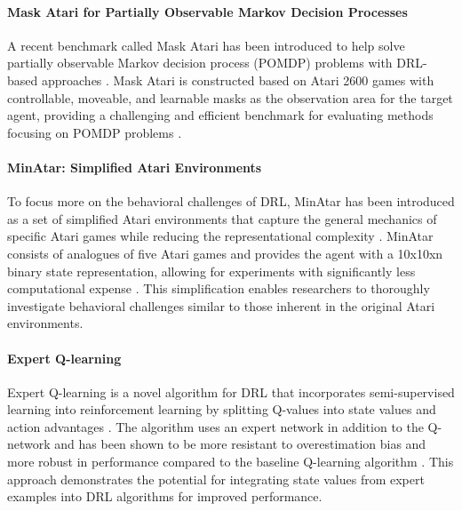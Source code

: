 \paragraph{Mask Atari for Partially Observable Markov Decision Processes}
A recent benchmark called Mask Atari has been introduced to help solve partially observable Markov decision process (POMDP) problems with DRL-based approaches \cite{2203.16777}. Mask Atari is constructed based on Atari 2600 games with controllable, moveable, and learnable masks as the observation area for the target agent, providing a challenging and efficient benchmark for evaluating methods focusing on POMDP problems \cite{2203.16777}.

\paragraph{MinAtar: Simplified Atari Environments}
To focus more on the behavioral challenges of DRL, MinAtar has been introduced as a set of simplified Atari environments that capture the general mechanics of specific Atari games while reducing the representational complexity \cite{1903.03176}. MinAtar consists of analogues of five Atari games and provides the agent with a 10x10xn binary state representation, allowing for experiments with significantly less computational expense \cite{1903.03176}. This simplification enables researchers to thoroughly investigate behavioral challenges similar to those inherent in the original Atari environments.

\paragraph{Expert Q-learning}
Expert Q-learning is a novel algorithm for DRL that incorporates semi-supervised learning into reinforcement learning by splitting Q-values into state values and action advantages \cite{2106.14642}. The algorithm uses an expert network in addition to the Q-network and has been shown to be more resistant to overestimation bias and more robust in performance compared to the baseline Q-learning algorithm \cite{2106.14642}. This approach demonstrates the potential for integrating state values from expert examples into DRL algorithms for improved performance.